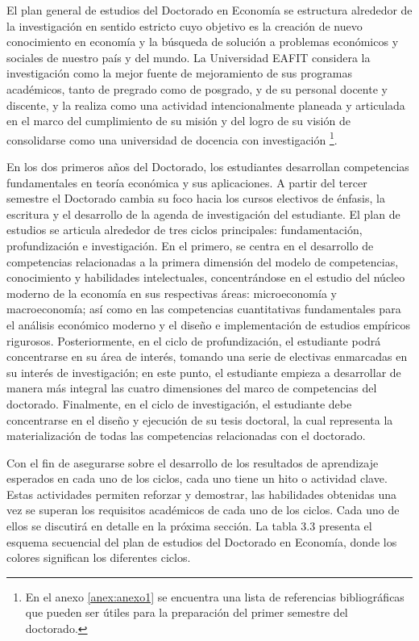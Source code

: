 El plan general de estudios del Doctorado en Economía se estructura alrededor de la investigación en sentido estricto cuyo objetivo es la creación de nuevo conocimiento en economía y la búsqueda de solución a problemas económicos y sociales de nuestro país y del mundo. La Universidad EAFIT considera la investigación como la mejor fuente de mejoramiento de sus programas académicos, tanto de pregrado como de posgrado, y de su personal docente y discente, y la realiza como una actividad intencionalmente planeada y articulada en el marco del cumplimiento de su misión y del logro de su visión de consolidarse como una universidad de docencia con investigación \footnote{En el anexo \ref{anex:anexo1} se encuentra una lista de referencias bibliográficas que pueden ser útiles para la preparación del primer semestre del doctorado.}. 

En los dos primeros años del Doctorado, los estudiantes desarrollan competencias fundamentales en teoría económica y sus aplicaciones. A partir del tercer semestre el Doctorado cambia su foco hacia los cursos electivos de énfasis, la escritura y el desarrollo de la agenda de investigación del estudiante.  El plan de estudios se articula alrededor de tres ciclos principales: fundamentación, profundización e investigación. En el primero, se centra en el desarrollo de competencias relacionadas a la primera dimensión del modelo de competencias, conocimiento y habilidades intelectuales, concentrándose en el estudio del núcleo moderno de la economía en sus respectivas áreas: microeconomía y macroeconomía; así como en las competencias cuantitativas fundamentales para el análisis económico moderno y el diseño e implementación de estudios empíricos rigurosos. Posteriormente, en el ciclo de profundización, el estudiante podrá concentrarse en su área de interés, tomando una serie de electivas enmarcadas en su interés de investigación; en este punto, el estudiante empieza a desarrollar de manera más integral las cuatro dimensiones del marco de competencias del doctorado. Finalmente, en el ciclo de investigación, el estudiante debe concentrarse en el diseño y ejecución de su tesis doctoral, la cual representa la materialización de todas las competencias relacionadas con el doctorado.

Con el fin de asegurarse sobre el desarrollo de los resultados de aprendizaje esperados en cada uno de los ciclos, cada uno tiene un hito o actividad clave. Estas actividades permiten reforzar y demostrar, las habilidades obtenidas una vez se superan los requisitos académicos de cada uno de los ciclos. Cada uno de ellos se discutirá en detalle en la próxima sección. La tabla 3.3 presenta el esquema secuencial del plan de estudios del Doctorado en Economía, donde los colores significan los diferentes ciclos.


